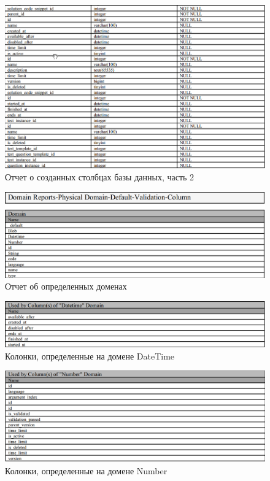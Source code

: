 \documentclass{article}
\begin{document}
\begin{figure}[H]
	\includegraphics[width=\textwidth, center]{ColumnReport_Part2.png}
	\caption{Отчет о созданных столбцах базы данных, часть 2}	
\end{figure}

\begin{figure}[H]
	\includegraphics[width=\textwidth, center]{DefinedDomains.png}
	\caption{Отчет об определенных доменах}
\end{figure}

\begin{figure}[H]
	\includegraphics[width=\textwidth, center]{DateTimeDomain.png}
	\caption{Колонки, определенные на домене DateTime}
\end{figure}

\begin{figure}[H]
	\includegraphics[width=\textwidth, center]{NumberDomain.png}
	\caption{Колонки, определенные на домене Number}
\end{figure}
\end{document}
